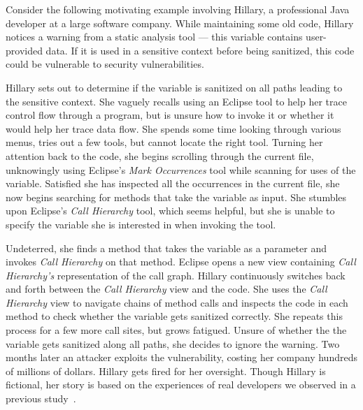 \documentclass[conference]{IEEEtran}
\begin{document}

Consider the following motivating example involving Hillary, a professional Java developer at a large software company.
While maintaining some old code, Hillary notices a warning from a static analysis tool --- this variable contains user-provided data. 
If it is used in a sensitive context before being sanitized, this code could be vulnerable to security vulnerabilities.

Hillary sets out to determine if the variable is sanitized on all paths leading to the sensitive context.
She vaguely recalls using an Eclipse tool to help her trace control flow through a program, but is unsure how to invoke it or whether it would help her trace data flow.
She spends some time looking through various menus, tries out a few tools, but cannot locate the right tool.
Turning her attention back to the code, she begins scrolling through the current file, unknowingly using Eclipse's \emph{Mark Occurrences} tool while scanning for uses of the variable. 
Satisfied she has inspected all the occurrences in the current file, she now begins searching for methods that take the variable as input.
She stumbles upon Eclipse's \emph{Call Hierarchy} tool, which seems helpful, but she is unable to specify the variable she is interested in when invoking the tool.

Undeterred, she finds a method that takes the variable as a parameter and invokes \emph{Call Hierarchy} on that method.
Eclipse opens a new view containing \emph{Call Hierarchy's} representation of the call graph.
Hillary continuously switches back and forth between the \emph{Call Hierarchy} view and the code.
She uses the \emph{Call Hierarchy} view to navigate chains of method calls and inspects the code in each method to check whether the variable gets sanitized correctly.
She repeats this process for a few more call sites, but grows fatigued. 
Unsure of whether the the variable gets sanitized along all paths, she decides to ignore the warning.
Two months later an attacker exploits the vulnerability, costing her company hundreds of millions of dollars. 
Hillary gets fired for her oversight. 
Though Hillary is fictional, her story is based on the experiences of real developers we observed in a previous study~\cite{Smith2015}.
\end{document}
